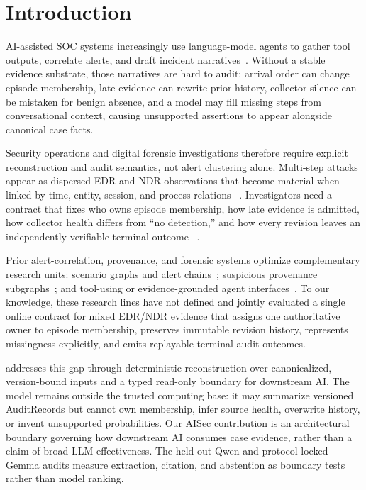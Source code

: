\section{Introduction}
\label{sec:introduction}

AI-assisted SOC systems increasingly use language-model agents to gather tool outputs, correlate
alerts, and draft incident narratives~\cite{react2023,cortex2025,auditableddos2026}. Without a
stable evidence substrate, those narratives are hard to audit: arrival order can change episode
membership, late evidence can rewrite prior history, collector silence can be mistaken for benign
absence, and a model may fill missing steps from conversational context, causing unsupported assertions
to appear alongside canonical case facts.

Security operations and digital forensic investigations therefore require explicit
reconstruction and audit semantics, not alert clustering alone. Multi-step attacks appear as dispersed EDR and NDR observations that become material
when linked by time, entity, session, and process relations
~\cite{alertfatigue2025,nist80086,breitinger2025sok}. Investigators need a contract that fixes who
owns episode membership, how late evidence is admitted, how collector health differs from ``no
detection,'' and how every revision leaves an independently verifiable terminal outcome
~\cite{casey2011digitalevidence,carrier2005filesystem,vanini2024timeanchors}.

Prior alert-correlation, provenance, and forensic systems optimize complementary research
units: scenario graphs and alert chains~\cite{ning2002attackscenarios}; suspicious provenance
subgraphs~\cite{holmes2019,unicorn2020,nodlink2024,kairos2024,captain2025}; and tool-using or
evidence-grounded agent interfaces~\cite{react2023,cortex2025}. To our knowledge, these research
lines have not defined and jointly evaluated a single online contract for mixed EDR/NDR evidence
that assigns one authoritative owner to episode membership, preserves immutable revision history,
represents missingness explicitly, and emits replayable terminal audit outcomes.

\trustepisode addresses this gap through deterministic reconstruction over canonicalized,
version-bound inputs and a typed read-only boundary for downstream AI. The model remains outside
the trusted computing base: it may summarize versioned AuditRecords but cannot own membership,
infer source health, overwrite history, or invent unsupported probabilities. Our AISec contribution
is an architectural boundary governing how downstream AI consumes case evidence, rather than a
claim of broad LLM effectiveness. The held-out Qwen and protocol-locked Gemma audits measure
extraction, citation, and abstention as boundary tests rather than model ranking.

